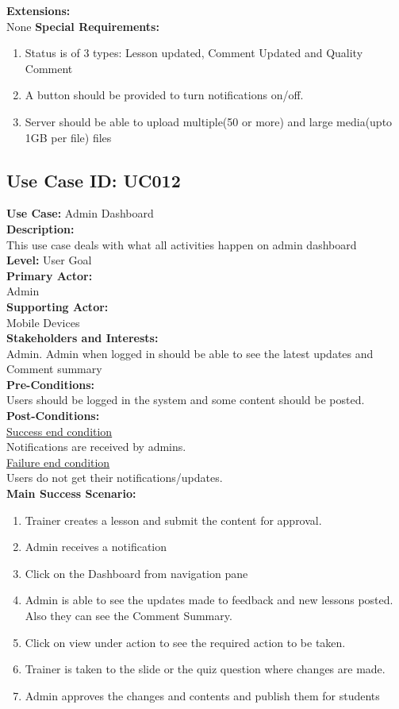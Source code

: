 \documentclass{report}
\begin{document}
\textbf{Extensions:}\\
None
\textbf{Special Requirements:}
\begin{enumerate}
    \item Status is of 3 types: Lesson updated, Comment Updated and Quality Comment
    \item A button should be provided to turn notifications on/off.
    \item Server should be able to upload multiple(50 or more) and large media(upto 1GB per file) files 
\end{enumerate}

\subsection{\textbf{Use Case ID:} UC012}
\textbf{Use Case:} Admin Dashboard\\[0.3cm]
\textbf{Description:}\\
This use case deals with what all activities happen on admin dashboard\\[0.3cm]
\textbf{Level:} User Goal\\[0.3cm]
\textbf{Primary Actor:}\\
Admin\\[0.3cm]
\textbf{Supporting Actor:}\\
Mobile Devices\\[0.3cm]
\textbf{Stakeholders and Interests:}\\
Admin. Admin when logged in should be able to see the latest updates and Comment summary\\[0.3cm]
\textbf{Pre-Conditions:}\\
Users should be logged in the system and some content should be posted.\\[0.3cm]
\textbf{Post-Conditions:}\\
\underline{Success end condition}\\
Notifications are received by admins.\\[0.3cm]
\underline{Failure end condition}\\
Users do not get their notifications/updates.\\[0.3cm]
\textbf{\large {Main Success Scenario:}}
\begin{enumerate}
    \item Trainer creates a lesson and submit the content for approval.
    \item Admin receives a notification
    \item Click on the Dashboard from navigation pane
    \item Admin is able to see the updates made to feedback and new lessons posted. Also they can see the Comment Summary.
    \item Click on view under action to see the required action to be taken.
    \item Trainer is taken to the slide or the quiz question where changes are made.
    \item Admin approves the changes and contents and publish them for students
\end{enumerate}
\end{document}
